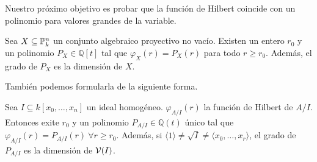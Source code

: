 \documentclass[ACGA.tex]{subfiles}
\begin{document}
Nuestro próximo objetivo es probar que la función de Hilbert coincide con un polinomio para valores grandes de la variable.

\begin{prop}\label{existepolinomio}
Sea $X\subseteq\mathbb{P}^n_k$ un conjunto algebraico proyectivo no vacío. Existen un entero $r_0$ y un polinomio $P_X\in {\mathbb Q}[t]$ tal que $\varphi_X(r)=P_X(r)$ para todo $r\geq r_0$. Además, el grado de $P_X$ es la dimensión de $X$.
\end{prop}
También podemos formularla de la siguiente forma.
\begin{prop}
Sea $I\subseteq k[x_0,\dots, x_n]$ un ideal homogéneo. $\varphi_{A/I}(r)$ la función de Hilbert de $A/I$. Entonces exite $r_0$ y un polinomio $P_{A/I}\in\mathbb{Q}(t)$ único tal que $\varphi_{A/I}(r)=P_{A/I}(r)\ \forall r\geq r_0$. Además, si $\langle 1\rangle \neq\sqrt{I}\neq \langle x_0,\dots, x_r\rangle$, el grado de $P_{A/I}$ es la dimensión de $\mathcal{V}(I)$. 
\end{prop}
\end{document}
